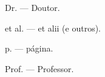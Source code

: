 \begin{abreviaturas}

    Dr. --- Doutor.

    et al. --- et alii (e outros).

    p. --- página.

    Prof. --- Professor.

\end{abreviaturas}
